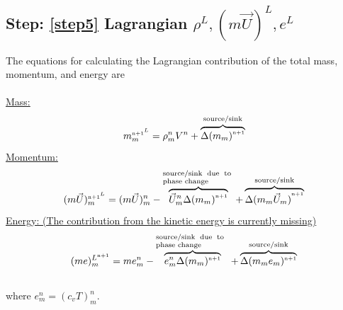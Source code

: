 \documentclass[fleqn]{article}
\begin{document}
{\subsection{Step: \ref{step5}  \textsf{Lagrangian $\rho^{L}, (m\vec{U})^{L}, e^{L}$}}
The equations for calculating the Lagrangian contribution of the total mass,
momentum, and energy are\\
\\
%
%
\underline{\textsf{Mass:}}
\begin{equation}
    \label{eq:rho_bar}
    \massnnLm = \rhonm \Vn + 
\overbrace{  \Delta{(m_{m})}^{\nadv}  }^{\text{source/sink}}  
\end{equation}
%
%
\underline{\textsf{Momentum:}}
\begin{equation}
    \label{eq:u_tilde}
    \momnnLm = \momnm -  \overbrace{ \unm \Delta{ (m_{m}) }^{\nadv}}^{ \text{\pboxsmall{source/sink due to phase change}}} + 
    \overbrace{   \Delta{ (m_{m} \um) }^{\nadv}    }^{  \text{source/sink}  }
\end{equation}   
%
%
\underline{\textsf{Energy: (The contribution from the kinetic energy is currently missing)}}
\begin{equation}
    \label{eq:T_tilde}
     (me)^{L^{\nadv}}_m= me^n_m  - \overbrace{  e^n_{m} \Delta{ (m_{m})^{\nadv }} }^{\text{\pboxsmall{source/sink due to phase change} }  } +
    \overbrace{  \Delta{ (m_{m} e_m)^{\nadv }  }  }^{  \text{source/sink}  }
\end{equation}
\\
%
where $e^n_{m}= (c_{v}T)^n_{m}.$\\
%
%
%
%
}
\end{document}
